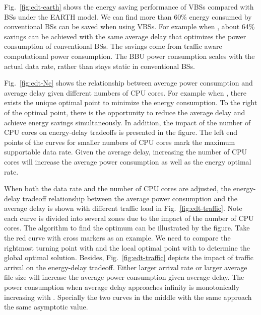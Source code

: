 \documentclass[conference]{IEEEtran}
\begin{document}
Fig.~\ref{fig:edt-earth} shows the energy saving performance of VBSs
compared with BSs under the EARTH model. We can find more than 60\% energy
consumed by conventional BSs can be saved when using VBSs. For example
when ,
about 64\% savings can be achieved with the same average delay 
that optimizes the power consumption of conventional BSs.
The savings come from traffic aware computational power consumption.
The BBU power consumption scales with the actual data rate, rather than stays
static in conventional BSs.

Fig.~\ref{fig:edt-Nc} shows the relationship between average power consumption
and average delay given different numbers of CPU cores.
For example when ,
there exists the unique optimal point to minimize the energy consumption.
To the right of the optimal point, there is the
opportunity to reduce the average delay and achieve energy savings
simultaneously.
In addition, the impact of the number of CPU cores on energy-delay tradeoffs is
presented in the figure.
The left end points of the curves for smaller numbers of CPU cores mark the maximum
supportable data rate.
Given the average delay, increasing the number of
CPU cores will increase the average power consumption as well as the energy
optimal rate.

When both the data rate and the number of CPU cores are adjusted, the
energy-delay tradeoff relationship
between the average power consumption and the average delay is shown with
different traffic load in Fig.~\ref{fig:edt-traffic}. Note
each curve is divided into several zones due to the impact of the number
of CPU cores. The algorithm to find the optimum
 can be illustrated by the figure.
Take the red curve with cross markers
as an example. We need to compare the
rightmost turning point with  and the local optimal point
with 
to determine the global optimal solution.
Besides, Fig.~\ref{fig:edt-traffic} depicts the impact of traffic
arrival on the energy-delay tradeoff.
Either larger arrival rate or larger average file size will increase
the average power consumption given average delay. The power consumption when
average delay approaches infinity is monotonically increasing with .
Specially the two curves in the middle
with the same  approach the same asymptotic value.
\end{document}
